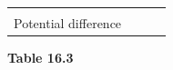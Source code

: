 \begin{enumerate}[noitemsep, label=\textbf{\arabic*}. ]
{{\begin{center}
\begin{tabular}[t]{|l|l|l|l|}
    
         &
    
    
         &
    
    
     \tabularnewline\cline{1-1}\cline{2-2}\cline{3-3}\cline{4-4}
    
    
        Potential difference &
    
    
         &
    
    
         &
    
    
     \tabularnewline\cline{1-1}\cline{2-2}\cline{3-3}\cline{4-4}
    \end{tabular}
      \end{center}
    \begin{center}{\small\bfseries Table 16.3}\end{center}
    
}}
\end{enumerate}
